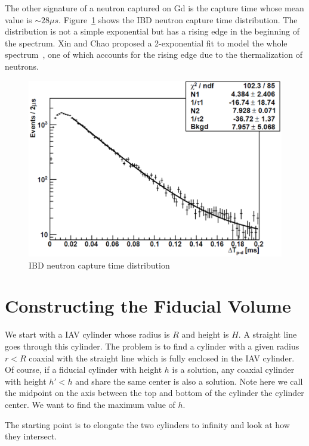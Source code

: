 \documentclass[paper=a4, fontsize=12pt, toc=left]{scrartcl} %
\numberwithin{equation}{section} %
\numberwithin{figure}{section} %
\numberwithin{table}{section} %
\begin{document}
The other signature of a neutron captured on Gd is the capture time whose mean value is $\sim 28\mu s$. Figure~\ref{fig:IBD_capture_time} shows the IBD neutron capture time distribution. The distribution is not a simple exponential but has a rising edge in the beginning of the spectrum. Xin and Chao proposed a 2-exponential fit to model the whole spectrum~\cite{docdb7299}, one of which accounts for the rising edge due to the thermalization of neutrons.
\begin{figure}
	\centering
	\includegraphics[width=.6\textwidth]{figures/IBD_capture_time.eps}
	\caption{IBD neutron capture time distribution~\cite{docdb7299}}
	\label{fig:IBD_capture_time}
\end{figure}



\appendix
\gdef\thesection{Appendix \Alph{section}}
\section{Constructing the Fiducial Volume} \label{app:a}
We start with a IAV cylinder whose radius is $R$ and height is $H$. A straight line goes through this cylinder. The problem is to find a cylinder with a given radius $r<R$ coaxial with the straight line which is fully enclosed in the IAV cylinder. Of course, if a fiducial cylinder with height $h$ is a solution, any coaxial cylinder with height $h'<h$ and share the same center is also a solution. Note here we call the midpoint on the axis between the top and bottom of the cylinder the cylinder center. We want to find the maximum value of $h$.

The starting point is to elongate the two cylinders to infinity and look at how they intersect.


\printbibliography[heading=bibintoc]
\end{document}
